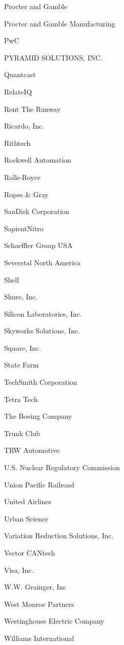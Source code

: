 \documentclass[twoside]{article}
\begin{document}
\begin{center}
\begin{multicols}{5}
\begin{FlushLeft}
\begin{compactitem}
\item Procter and Gamble
\item Procter and Gamble Manufacturing
\item PwC
\item PYRAMID SOLUTIONS, INC.
\item Quantcast
\item RelateIQ
\item Rent The Runway
\item Ricardo, Inc.
\item Rithtech
\item Rockwell Automation
\item Rolls-Royce
\item Ropes \& Gray
\item SanDisk Corporation
\item SapientNitro
\item Schaeffler Group USA
\item Severstal North America
\item Shell
\item Shure, Inc.
\item Silicon Laboratories, Inc.
\item Skyworks Solutions, Inc.
\item Square, Inc.
\item State Farm
\item TechSmith Corporation
\item Tetra Tech
\item The Boeing Company
\item Trunk Club
\item TRW Automotive
\item U.S. Nuclear Regulatory Commission
\item Union Pacific Railroad
\item United Airlines
\item Urban Science
\item Variation Reduction Solutions, Inc.
\item Vector CANtech
\item Visa, Inc.
\item W.W. Grainger, Inc
\item West Monroe Partners
\item Westinghouse Electric Company
\item Williams International
\end{compactitem}
        \end{FlushLeft}
        \vspace{1em}

\end{multicols}
\end{center}
\end{document}
